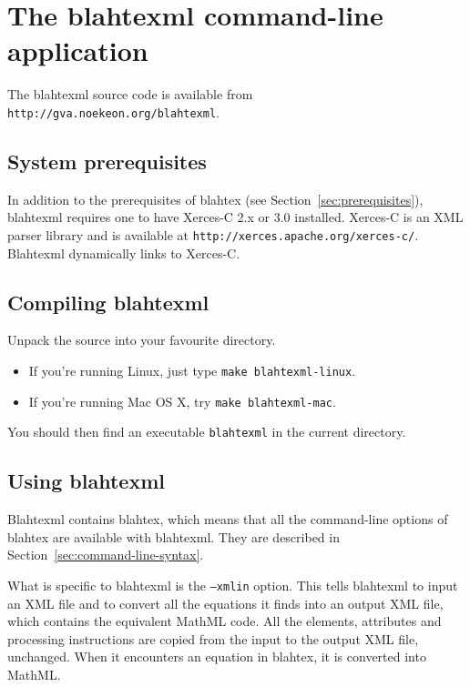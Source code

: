 \documentclass{article}
\begin{document}
\section{The blahtexml command-line application}\label{sec:blahtexml}

The blahtexml source code is available from \texttt{http://gva.noekeon.org/blahtexml}.

\subsection{System prerequisites}\label{sec:blahtexml-prerequisites}

In addition to the prerequisites of blahtex (see Section~\ref{sec:prerequisites}), blahtexml requires one to have Xerces-C 2.x or 3.0 installed. Xerces-C is an XML parser library and is available at \texttt{http://xerces.apache.org/xerces-c/}. Blahtexml dynamically links to Xerces-C.

\subsection{Compiling blahtexml}\label{sec:compiling-blahtexml}

Unpack the source into your favourite directory.
\begin{itemize}
\item If you're running Linux, just type \texttt{make blahtexml-linux}.
\item If you're running Mac OS X, try \texttt{make blahtexml-mac}.
\end{itemize}
You should then find an executable \texttt{blahtexml} in the current directory.

\subsection{Using blahtexml}\label{sec:blahtexml-command-line-syntax}

Blahtexml contains blahtex, which means that all the command-line options of blahtex are available with blahtexml. They are described in Section~\ref{sec:command-line-syntax}.

What is specific to blahtexml is the \texttt{--xmlin} option. This tells blahtexml to input an XML file and to convert all the equations it finds into an output XML file, which contains the equivalent MathML code. All the elements, attributes and processing instructions are copied from the input to the output XML file, unchanged. When it encounters an equation in blahtex, it is converted into MathML.
\end{document}

